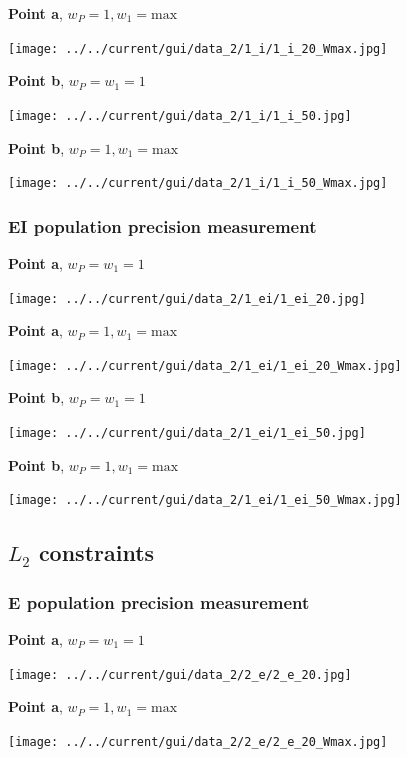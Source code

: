 \documentclass[]{article}
\begin{document}
\newpage

\textbf{Point a}, $w_P = 1, w_1 = \text{max}$

\texttt{[image: ../../current/gui/data\_2/1\_i/1\_i\_20\_Wmax.jpg]}
\newpage

\textbf{Point b}, $w_P = w_1 = 1$

\texttt{[image: ../../current/gui/data\_2/1\_i/1\_i\_50.jpg]}
\newpage

\textbf{Point b}, $w_P = 1, w_1 = \text{max}$


\texttt{[image: ../../current/gui/data\_2/1\_i/1\_i\_50\_Wmax.jpg]}
\newpage

\subsubsection{EI population precision measurement}

\textbf{Point a}, $w_P = w_1 = 1$

\texttt{[image: ../../current/gui/data\_2/1\_ei/1\_ei\_20.jpg]}
\newpage

\textbf{Point a}, $w_P = 1, w_1 = \text{max}$

\texttt{[image: ../../current/gui/data\_2/1\_ei/1\_ei\_20\_Wmax.jpg]}
\newpage

\textbf{Point b}, $w_P = w_1 = 1$

\texttt{[image: ../../current/gui/data\_2/1\_ei/1\_ei\_50.jpg]}
\newpage

\textbf{Point b}, $w_P = 1, w_1 = \text{max}$

\texttt{[image: ../../current/gui/data\_2/1\_ei/1\_ei\_50\_Wmax.jpg]}
\newpage

\subsection{$L_2$ constraints}

\subsubsection{E population precision measurement}

\textbf{Point a}, $w_P = w_1 = 1$

\texttt{[image: ../../current/gui/data\_2/2\_e/2\_e\_20.jpg]}
\newpage

\textbf{Point a}, $w_P = 1, w_1 = \text{max}$

\texttt{[image: ../../current/gui/data\_2/2\_e/2\_e\_20\_Wmax.jpg]}
\newpage
\end{document}
